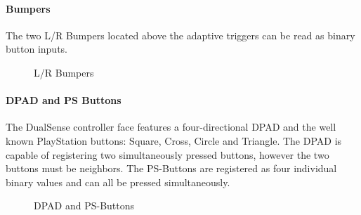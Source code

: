 \paragraph{Bumpers}
The two L/R Bumpers located above the adaptive triggers can be read as binary button inputs.
\begin{figure}[H]
    \centering
    \caption{L/R Bumpers}
\end{figure}

\paragraph{DPAD and PS Buttons}
The DualSense controller face features a four-directional DPAD and the well known PlayStation buttons: Square, Cross, Circle and Triangle. The DPAD is capable of registering two simultaneously pressed buttons, however the two buttons must be neighbors. The PS-Buttons are registered as four individual binary values and can all be pressed simultaneously.
\begin{figure}[H]
    \centering
    \caption{DPAD and PS-Buttons}
\end{figure}

